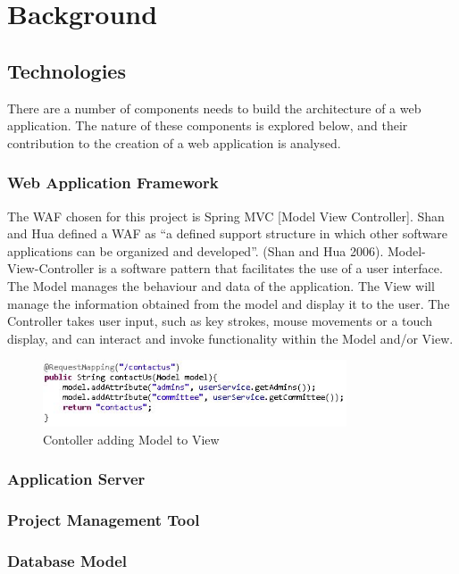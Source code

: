 \chapter{Background}
\label{background}

\section{Technologies}

There are a number of components needs to build the architecture of a web application. The nature of these components is explored below, and their contribution to the creation of a web application is analysed.

\subsection{Web Application Framework}
The WAF chosen for this project is Spring MVC [Model View Controller]. Shan and Hua defined a WAF as “a defined support structure in which other software applications can be organized and developed”. (Shan and Hua 2006). Model-View-Controller is a software pattern that facilitates the use of a user interface. The Model manages the behaviour and data of the application. The View will manage the information obtained from the model and display it to the user. The Controller takes user input, such as key strokes, mouse movements or a touch display, and can interact and invoke functionality within the Model and/or View.

\begin{figure}[ht!]
\centering
\includegraphics[width=90mm]{figs/fig3-4-1.jpg}
\caption{Contoller adding Model to View}
\label{overflow}
\end{figure}

\subsection{Application Server}

\subsection{Project Management Tool}

\subsection{Database Model}

